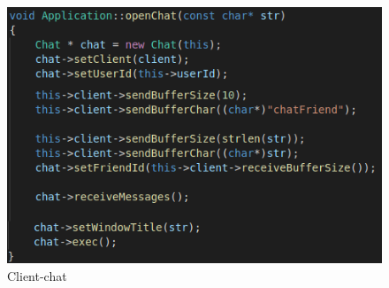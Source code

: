 \documentclass[runningheads]{llncs}
\begin{document}
\begin{figure}[H]
\begin{center}
\includegraphics[]{images/client-chat.png}
\caption{Client-chat}
\end{center}
\end{figure}

\newpage
\end{document}
